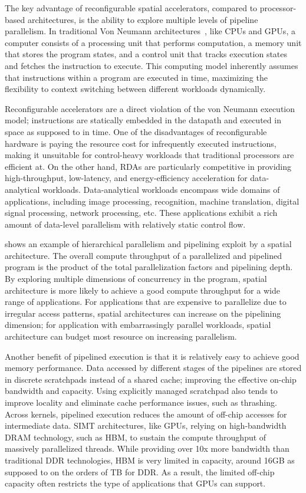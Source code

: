 The key advantage of reconfigurable spatial accelerators, compared to processor-based architectures, 
is the ability to explore multiple levels of pipeline parallelism. 
In traditional Von Neumann architectures~\cite{vonneumann}, like CPUs and GPUs,
a computer consists of a processing unit that performs
computation, a memory unit that stores the program states, and a control unit that tracks execution states and fetches the instruction to execute. This computing model inherently assumes that
instructions within a program are executed in time, maximizing the flexibility to context switching between different workloads dynamically.

Reconfigurable accelerators are a direct violation of the von Neumann execution model; 
instructions are statically embedded in the datapath and executed in space as supposed to in time.
One of the disadvantages of reconfigurable hardware is paying the resource cost for infrequently
executed instructions, making it unsuitable for control-heavy workloads that traditional
processors are efficient at.
On the other hand, RDAs are particularly competitive in providing high-throughput, 
low-latency, and energy-efficiency acceleration for data-analytical workloads.
Data-analytical workloads encompass wide domains of applications, including image processing,
recognition, machine translation, digital signal processing, network processing, etc.
These applications exhibit a rich amount of data-level parallelism with relatively static control
flow.

 shows an example of hierarchical parallelism and pipelining exploit by
a spatial architecture.
The overall compute throughput of a parallelized and pipelined program is 
the product of the total parallelization factors and pipelining depth.
By exploring multiple dimensions of concurrency in the program, spatial architecture is more likely
to achieve a good compute throughput for a wide range of applications.
For applications that are expensive to parallelize due to irregular access patterns, spatial
architectures can increase on the pipelining dimension;
for application with embarrassingly parallel workloads, spatial architecture can budget most
resource on increasing parallelism.

Another benefit of pipelined execution is that it is relatively easy to achieve good memory performance.
Data accessed by different stages of the pipelines are stored in discrete scratchpads instead of a shared cache; improving the effective on-chip bandwidth and capacity.
Using explicitly managed scratchpad also tends to improve locality and eliminate cache performance issues, such as thrashing.
Across kernels, pipelined execution reduces the amount of off-chip accesses for intermediate
data.
SIMT architectures, like GPUs, relying on high-bandwidth DRAM technology, such as HBM, to sustain
the compute throughput of massively parallelized threads.
While providing over 10x more bandwidth than traditional DDR technologies, HBM is very limited in
capacity, around 16GB as supposed to on the orders of TB for DDR.
As a result, the limited off-chip capacity often restricts the type of applications that
GPUs can support.


